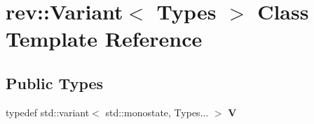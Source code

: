 \hypertarget{classrev_1_1_variant}{}\section{rev\+::Variant$<$ Types $>$ Class Template Reference}
\label{classrev_1_1_variant}
\subsection*{Public Types}
\begin{DoxyCompactItemize}
\item 
\mbox{\label{classrev_1_1_variant_aa6b6238fc8d1f005866d3467e57dc65b}} 
typedef std\+::variant$<$ std\+::monostate, Types... $>$ {\bfseries V}
\end{DoxyCompactItemize}
